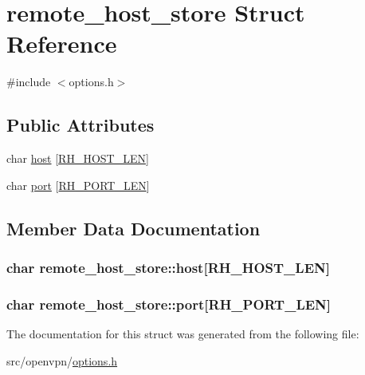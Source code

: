 \hypertarget{structremote__host__store}{}\section{remote\+\_\+host\+\_\+store Struct Reference}
\label{structremote__host__store}


{\ttfamily \#include $<$options.\+h$>$}

\subsection*{Public Attributes}
\begin{DoxyCompactItemize}
\item 
char \hyperlink{structremote__host__store_ab6854214ebc227e7b7bb7c326e20b8ea}{host} \mbox{[}\hyperlink{options_8h_aac0966b4ee4569318eb2fa0c1f2af10c}{R\+H\+\_\+\+H\+O\+S\+T\+\_\+\+L\+E\+N}\mbox{]}
\item 
char \hyperlink{structremote__host__store_a2d542ea8cd04452e39d0d0134f9864d6}{port} \mbox{[}\hyperlink{options_8h_a91dc7e314ac4ab9357585c15de7b48c8}{R\+H\+\_\+\+P\+O\+R\+T\+\_\+\+L\+E\+N}\mbox{]}
\end{DoxyCompactItemize}


\subsection{Member Data Documentation}
\hypertarget{structremote__host__store_ab6854214ebc227e7b7bb7c326e20b8ea}{}
\subsubsection[{host}]{\setlength{\rightskip}{0pt plus 5cm}char remote\+\_\+host\+\_\+store\+::host\mbox{[}{\bf R\+H\+\_\+\+H\+O\+S\+T\+\_\+\+L\+E\+N}\mbox{]}}\label{structremote__host__store_ab6854214ebc227e7b7bb7c326e20b8ea}
\hypertarget{structremote__host__store_a2d542ea8cd04452e39d0d0134f9864d6}{}
\subsubsection[{port}]{\setlength{\rightskip}{0pt plus 5cm}char remote\+\_\+host\+\_\+store\+::port\mbox{[}{\bf R\+H\+\_\+\+P\+O\+R\+T\+\_\+\+L\+E\+N}\mbox{]}}\label{structremote__host__store_a2d542ea8cd04452e39d0d0134f9864d6}


The documentation for this struct was generated from the following file\+:\begin{DoxyCompactItemize}
\item 
src/openvpn/\hyperlink{options_8h}{options.\+h}\end{DoxyCompactItemize}
